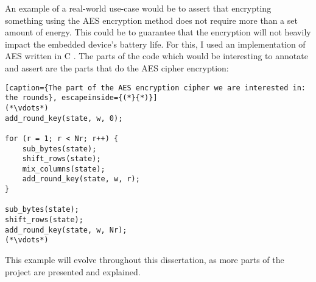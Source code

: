 An example of a real-world use-case would be to assert that encrypting something using the AES encryption method does not require more than a set amount of energy. This could be to guarantee that the encryption will not heavily impact the embedded device's battery life. For this, I used an implementation of AES written in C \cite{c_aes}. The parts of the code which would be interesting to annotate and assert are the parts that do the AES cipher encryption:
\begin{lstlisting}[caption={The part of the AES encryption cipher we are interested in: the rounds}, escapeinside={(*}{*)}]
(*\vdots*)
add_round_key(state, w, 0);

for (r = 1; r < Nr; r++) {
    sub_bytes(state);
    shift_rows(state);
    mix_columns(state);
    add_round_key(state, w, r);
}

sub_bytes(state);
shift_rows(state);
add_round_key(state, w, Nr);
(*\vdots*)
\end{lstlisting}

This example will evolve throughout this dissertation, as more parts of the project are presented and explained.
